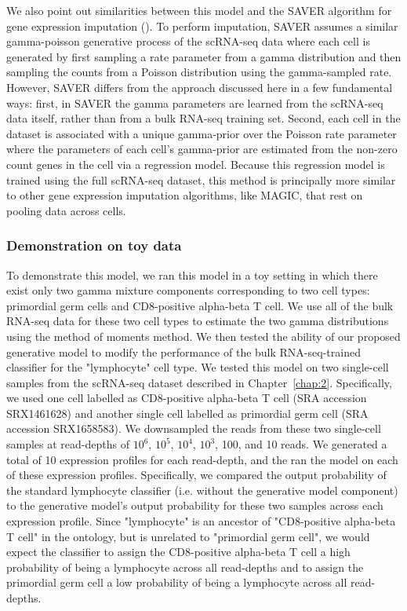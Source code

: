 We also point out similarities between this model and the SAVER algorithm for gene expression imputation (\citealp{Huang2018}). To perform imputation, SAVER assumes a similar gamma-poisson generative process of the scRNA-seq data where each cell is generated by first sampling a rate parameter from a gamma distribution and then sampling the counts from a Poisson distribution using the gamma-sampled rate. However, SAVER differs from the approach discussed here in a few fundamental ways: first, in SAVER the gamma parameters are learned from the scRNA-seq data itself, rather than from a bulk RNA-seq training set. Second, each cell in the dataset is associated with a unique gamma-prior over the Poisson rate parameter where the parameters of each cell's gamma-prior are estimated from the non-zero count genes in the cell via a regression model.  Because this regression model is trained using the full scRNA-seq dataset, this method is principally more similar to other gene expression imputation algorithms, like MAGIC, that rest on pooling data across cells.

 \subsubsection{Demonstration on toy data}
 
 To demonstrate this model, we ran this model in a toy setting in which there exist only two gamma mixture components corresponding to two cell types: primordial germ cells and CD8-positive alpha-beta T cell. We use all of the bulk RNA-seq data for these two cell types to estimate the two gamma distributions using the method of moments method. We then tested the ability of our proposed generative model to modify the performance of the bulk RNA-seq-trained classifier for the "lymphocyte" cell type.  We tested this model on two single-cell samples from the scRNA-seq dataset described in Chapter~\ref{chap:2}.  Specifically, we used one cell labelled as CD8-positive alpha-beta T cell  (SRA accession SRX1461628) and another single cell labelled as primordial germ cell (SRA accession SRX1658583).  We downsampled the reads from these two single-cell samples at read-depths of $10^6$, $10^5$, $10^4$, $10^3$, 100, and 10 reads. We generated a total of 10 expression profiles for each read-depth, and the ran the model on each of these expression profiles.  Specifically, we compared the output probability of the standard lymphocyte classifier (i.e. without the generative model component) to the generative model's output probability for these two samples across each expression profile.  Since "lymphocyte" is an ancestor of "CD8-positive alpha-beta T cell" in the ontology, but is unrelated to "primordial germ cell", we would expect the classifier to assign the CD8-positive alpha-beta T cell a high probability of being a lymphocyte across all read-depths and to assign the primordial germ cell a low probability of being a lymphocyte across all read-depths. 
 
